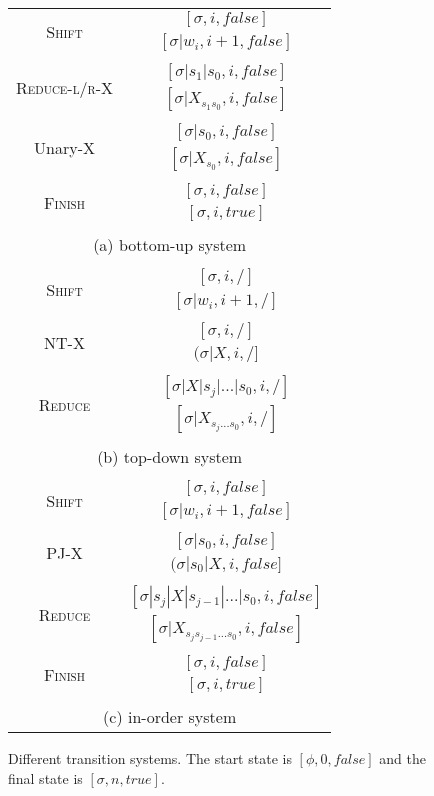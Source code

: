 \documentclass[11pt,letterpaper]{article}
\begin{document}
\begin{figure}[!tp]
\centering
\renewcommand{\arraystretch}{0.8}
\begin{tabular}{cc}
\multirow{2}{*}{\textsc{Shift}} & $[\sigma, i, false]$ \\
\cline{2-2}
&$[\sigma|w_i, i+1, false]$ \\
\\
\multirow{2}{*}{\textsc{Reduce-l/r-X}} & $[\sigma|s_1|s_0, i, false]$ \\
\cline{2-2}
&$[\sigma|X_{s_1s_0}, i, false]$\\
\\
\multirow{2}{*}{Unary-X} & $[\sigma|s_0, i, false]$ \\
\cline{2-2} 
&$[\sigma|X_{s_0}, i, false]$\\
\\
\multirow{2}{*}{\textsc{Finish}} & $[\sigma, i, false]$ \\
\cline{2-2}
&$[\sigma, i, true]$\\
\\
\multicolumn{2}{c}{(a) bottom-up system} \\
\\
\multirow{2}{*}{\textsc{Shift}} & $[\sigma, i, /]$ \\
\cline{2-2}
&$[\sigma|w_i, i+1, /]$ \\
\\
\multirow{2}{*}{\textsc{NT-X}} & $[\sigma, i, /]$ \\
\cline{2-2}
&$(\sigma|X, i, /]$\\
\\
\multirow{2}{*}{\textsc{Reduce}} & $[\sigma|X|s_j|...|s_0, i, /]$ \\
\cline{2-2} 
&$[\sigma|X_{s_j...s_0}, i, /]$\\
\\
\multicolumn{2}{c}{(b) top-down system} \\
\\
\multirow{2}{*}{\textsc{Shift}} & $[\sigma, i, false]$ \\
\cline{2-2}
&$[\sigma|w_i, i+1, false]$ \\
\\
\multirow{2}{*}{\textsc{PJ-X}} & $[\sigma|s_0, i, false]$ \\
\cline{2-2}
&$(\sigma|s_0|X, i, false]$\\
\\
\multirow{2}{*}{\textsc{Reduce}} & $[\sigma|s_j|X|s_{j-1}|...|s_0, i, false]$ \\
\cline{2-2} 
&$[\sigma|X_{s_js_{j-1}...s_0}, i, false]$\\
\\
\multirow{2}{*}{\textsc{Finish}} & $[\sigma, i, false]$ \\
\cline{2-2} 
&$[\sigma, i, true]$\\
\\
\multicolumn{2}{c}{(c) in-order system} \\
\end{tabular}
\caption{Different transition systems. The start state is $[\phi, 0, false]$ and the final state is $[\sigma, n, true]$.}
\label{deduction}
\end{figure}
\end{document}

